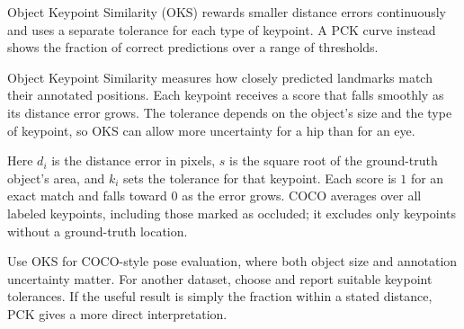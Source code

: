 \metricsecondary

Object Keypoint Similarity (OKS) rewards smaller distance errors continuously and uses a separate tolerance for each type of keypoint. A PCK curve instead shows the fraction of correct predictions over a range of thresholds.

\metricend
\clearpage
\thispagestyle{cvstyle}
\label{sec:oks}

Object Keypoint Similarity measures how closely predicted landmarks match their annotated positions. Each keypoint receives a score that falls smoothly as its distance error grows. The tolerance depends on the object's size and the type of keypoint, so OKS can allow more uncertainty for a hip than for an eye.

\begin{metricformula}
\end{metricformula}

Here $d_i$ is the distance error in pixels, $s$ is the square root of the ground-truth object's area, and $k_i$ sets the tolerance for that keypoint. Each score is $1$ for an exact match and falls toward $0$ as the error grows. COCO averages over all labeled keypoints, including those marked as occluded; it excludes only keypoints without a ground-truth location.


Use OKS for COCO-style pose evaluation, where both object size and annotation uncertainty matter. For another dataset, choose and report suitable keypoint tolerances. If the useful result is simply the fraction within a stated distance, PCK gives a more direct interpretation.


